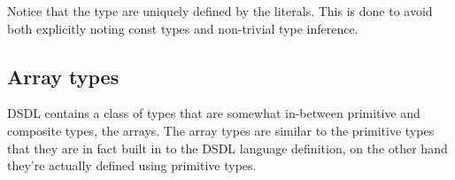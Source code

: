 
Notice that the type are uniquely defined by the literals.
This is done to avoid both explicitly noting const types and non-trivial type inference.


\subsection{Array types}\label{sec:dsdl_array_data_types}
DSDL contains a class of types that are somewhat in-between primitive and composite types, the arrays.
The array types are similar to the primitive types that they are in fact built in to the DSDL language definition,
on the other hand they're actually defined using primitive types.

